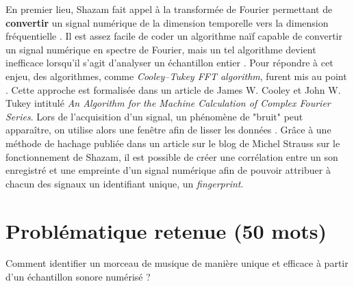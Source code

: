 \documentclass[12pt,a4paper]{article}
\begin{document}
En premier lieu, Shazam fait appel à la transformée de Fourier permettant de \textbf{convertir} un signal numérique de la dimension temporelle vers la dimension fréquentielle \cite{ouahabi_analyseurs_2023}. Il est assez facile de coder un algorithme naïf capable de convertir un signal numérique en spectre de Fourier, mais un tel algorithme devient inefficace lorsqu'il s'agit d'analyser un échantillon entier \cite{TP_FFt} . Pour répondre à cet enjeu, des algorithmes, comme \textit{Cooley–Tukey FFT algorithm}, furent mis au point \cite{noauthor_cooleytukey_2024}. Cette approche est formalisée dans un article de James W. Cooley et John W. Tukey intitulé \textit{An Algorithm for the Machine Calculation of Complex Fourier Series}\cite{First_Article_Cooley_Tukey}. Lors de l'acquisition d'un signal, un phénomène de "bruit" peut apparaître, on utilise alors une fenêtre afin de lisser les données \cite{noauthor_fenetrage_2024} . Grâce à une méthode de hachage publiée dans un article sur le blog de Michel Strauss sur le fonctionnement de Shazam, il est possible de créer une corrélation entre un son enregistré et une empreinte d'un signal numérique afin de pouvoir attribuer à chacun des signaux un identifiant unique, un \textit{fingerprint}\cite{noauthor_how_nodate}. 
\section*{Problématique retenue (50 mots)}
Comment identifier un morceau de musique de manière unique et efficace à partir d'un échantillon sonore numérisé ?
\end{document}
